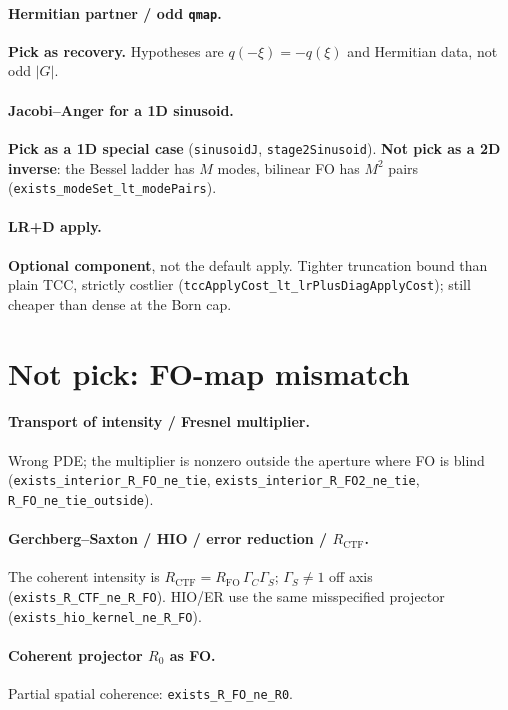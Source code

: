 \documentclass[11pt,a4paper]{article}
\theoremstyle{definition}
\theoremstyle{remark}
\newcommand{\abs}[1]{\lvert#1\rvert}
\newcommand{\RFO}{R_{\mathrm{FO}}}
\newcommand{\RCTF}{R_{\mathrm{CTF}}}
\begin{document}
\paragraph{Hermitian partner / odd \texttt{qmap}.}
\textbf{Pick as recovery.} Hypotheses are
$q(-\xi)=-q(\xi)$ and Hermitian data, not odd $\abs{G}$.

\paragraph{Jacobi--Anger for a 1D sinusoid.}
\textbf{Pick as a 1D special case} (\texttt{sinusoidJ},
\texttt{stage2Sinusoid}).
\textbf{Not pick as a 2D inverse}: the Bessel ladder has $M$ modes,
bilinear FO has $M^2$ pairs
(\texttt{exists\_modeSet\_lt\_modePairs}).

\paragraph{LR+D apply.}
\textbf{Optional component}, not the default apply.
Tighter truncation bound than plain TCC, strictly costlier
(\texttt{tccApplyCost\_lt\_lrPlusDiagApplyCost}); still cheaper than
dense at the Born cap.

\section{Not pick: FO-map mismatch}
\label{sec:fail}

\paragraph{Transport of intensity / Fresnel multiplier.}
Wrong PDE; the multiplier is nonzero outside the aperture where FO is
blind (\texttt{exists\_interior\_R\_FO\_ne\_tie},
\texttt{exists\_interior\_R\_FO2\_ne\_tie},
\texttt{R\_FO\_ne\_tie\_outside}).

\paragraph{Gerchberg--Saxton / HIO / error reduction / $\RCTF$.}
The coherent intensity is
$\RCTF=\RFO\,\Gamma_C\Gamma_S$; $\Gamma_S\neq 1$ off axis
(\texttt{exists\_R\_CTF\_ne\_R\_FO}).
HIO/ER use the same misspecified projector
(\texttt{exists\_hio\_kernel\_ne\_R\_FO}).

\paragraph{Coherent projector $R_0$ as FO.}
Partial spatial coherence: \texttt{exists\_R\_FO\_ne\_R0}.
\end{document}
